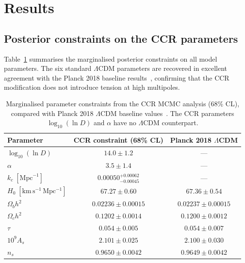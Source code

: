 
\section{Results}
\label{sec:results}

\subsection{Posterior constraints on the CCR parameters}

Table~\ref{tab:constraints} summarises the marginalised posterior
constraints on all model parameters. The six standard $\Lambda$CDM
parameters are recovered in excellent agreement with the Planck 2018
baseline results~\cite{Planck:2018params}, confirming that the CCR
modification does not introduce tension at high multipoles.

\begin{table}[t]
\centering
\begin{tabular}{lcc}
\toprule
Parameter & CCR constraint (68\% CL) & Planck 2018 $\Lambda$CDM \\
\midrule
$\log_{10}(\ln D)$ & $14.0 \pm 1.2$ & --- \\
$\alpha$ & $3.5 \pm 1.4$ & --- \\
$k_c\;[\mathrm{Mpc}^{-1}]$ & $0.00050^{+0.00062}_{-0.00045}$ & --- \\
$H_0\;[\mathrm{km\,s^{-1}\,Mpc^{-1}}]$ & $67.27 \pm 0.60$ & $67.36 \pm 0.54$ \\
$\Omega_b h^2$ & $0.02236 \pm 0.00015$ & $0.02237 \pm 0.00015$ \\
$\Omega_c h^2$ & $0.1202 \pm 0.0014$ & $0.1200 \pm 0.0012$ \\
$\tau$ & $0.054 \pm 0.005$ & $0.054 \pm 0.007$ \\
$10^9 A_s$ & $2.101 \pm 0.025$ & $2.100 \pm 0.030$ \\
$n_s$ & $0.9650 \pm 0.0042$ & $0.9649 \pm 0.0042$ \\
\bottomrule
\end{tabular}
\caption{Marginalised parameter constraints from the CCR MCMC analysis
  (68\% CL), compared with Planck 2018 $\Lambda$CDM baseline
  values~\cite{Planck:2018params}. The CCR parameters
  $\log_{10}(\ln D)$ and $\alpha$ have no $\Lambda$CDM counterpart.}
\label{tab:constraints}
\end{table}

